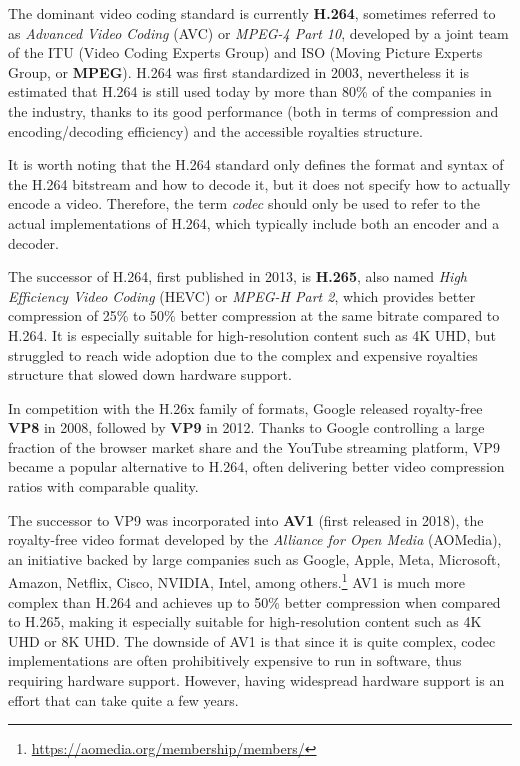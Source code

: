 The dominant video coding standard is currently \textbf{H.264}, sometimes referred to as \textit{Advanced Video Coding} (AVC) or \textit{MPEG-4 Part 10}, developed by a joint team of the ITU (Video Coding Experts Group) and ISO (Moving Picture Experts Group, or \textbf{MPEG}). H.264 was first standardized in 2003, nevertheless it is estimated that H.264 is still used today by more than 80\% of the companies in the industry, thanks to its good performance (both in terms of compression and encoding/decoding efficiency) and the accessible royalties structure.\cite{bitmovin}

It is worth noting that the H.264 standard only defines the format and syntax of the H.264 bitstream and how to decode it, but it does not specify how to actually encode a video. Therefore, the term \textit{codec} should only be used to refer to the actual implementations of H.264, which typically include both an encoder and a decoder.

The successor of H.264, first published in 2013, is \textbf{H.265}, also named \textit{High Efficiency Video Coding} (HEVC) or \textit{MPEG-H Part 2}, which provides better compression of 25\% to 50\% better compression at the same bitrate compared to H.264. It is especially suitable for high-resolution content such as 4K UHD, but struggled to reach wide adoption due to the complex and expensive royalties structure that slowed down hardware support.\cite{hevcroyalties}

In competition with the H.26x family of formats, Google released royalty-free \textbf{VP8} in 2008, followed by \textbf{VP9} in 2012. Thanks to Google controlling a large fraction of the browser market share and the YouTube streaming platform, VP9 became a popular alternative to H.264, often delivering better video compression ratios with comparable quality.\cite{bitmovin}

The successor to VP9 was incorporated into \textbf{AV1} (first released in 2018), the royalty-free video format developed by the \textit{Alliance for Open Media} (AOMedia), an initiative backed by large companies such as Google, Apple, Meta, Microsoft, Amazon, Netflix, Cisco, NVIDIA, Intel, among others.\footnote{\url{https://aomedia.org/membership/members/}} AV1 is much more complex than H.264 and achieves up to 50\% better compression when compared to H.265, making it especially suitable for high-resolution content such as 4K UHD or 8K UHD. The downside of AV1 is that since it is quite complex, codec implementations are often prohibitively expensive to run in software, thus requiring hardware support. However, having widespread hardware support is an effort that can take quite a few years.\cite{av1}

